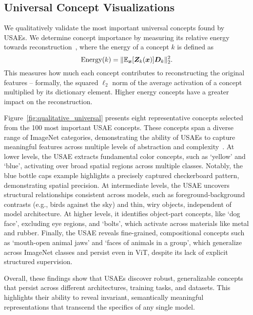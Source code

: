 \vspace{-3mm}
\subsection{Universal Concept Visualizations}\label{sec:universal_visualizations}
\vspace{-1mm}
We qualitatively validate 
the most important universal concepts found by USAEs. We determine concept importance by measuring its relative energy towards reconstruction~\cite{gillis2020nonnegative}, where the energy of a concept $k$ is defined as
\begin{equation}
    \text{Energy}(k) = \|\mathbb{E}_{\bm{x}}[\bm{Z}_k(\bm{x})] \bm{D}_k\|_2^2. 
\end{equation}
This measures how much each concept contributes to reconstructing the original features -- formally, the squared $\ell_2$ norm of the average activation of a concept multiplied by its dictionary element. Higher energy concepts have a greater impact on the reconstruction.

Figure~\ref{fig:qualitative_universal} presents eight representative concepts selected from the 100 most important USAE concepts. These concepts span a diverse range of ImageNet categories, demonstrating the ability of USAEs to capture meaningful features across multiple levels of abstraction and complexity~\cite{olah2017feature,fel2024understanding}.
At lower levels, the USAE extracts fundamental color concepts, such as `yellow' and `blue', activating over broad spatial regions across multiple classes. Notably, the blue bottle caps example highlights a precisely captured checkerboard pattern, demonstrating spatial precision. 
At intermediate levels, the USAE uncovers structural relationships consistent across models, such as foreground-background contrasts (e.g., birds against the sky) and thin, wiry objects, independent of model architecture.
At higher levels, it identifies object-part concepts, like `dog face', excluding eye regions, and `bolts', which activate across materials like metal and rubber.
Finally, the USAE reveals fine-grained, compositional concepts such as `mouth-open animal jaws' and `faces of animals in a group', which generalize across ImageNet classes and persist even in ViT, despite its lack of explicit structured supervision.


Overall, these findings show that USAEs discover robust, generalizable concepts that persist across different architectures, training tasks, and datasets. This highlights their ability to reveal invariant, semantically meaningful representations that transcend the specifics of any single model.



